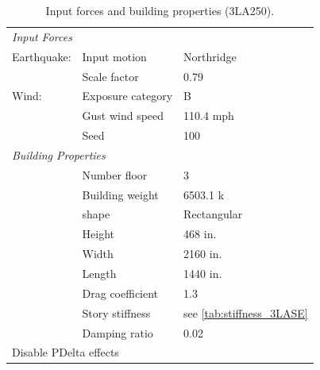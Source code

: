 \documentclass{simcenterdocumentation}
\begin{document}
\begin{table}[H]
	\centering \caption{Input forces and building properties (3LA250).}
	\begin{tabular}{lll}
	\toprule
	\multicolumn{3}{l}{\textit{Input Forces}}					\\
	\cmidrule(rl){1-3}
	Earthquake:		& Input motion		& Northridge			\\
					& Scale factor		& 0.79					\\
	Wind:			& Exposure category	& B						\\
					& Gust wind speed	& 110.4 mph				\\
					& Seed				& 100					\\
	\midrule
	\multicolumn{3}{l}{\textit{Building Properties}}			\\
	\cmidrule(rl){1-3}
					& Number floor		& 3						\\
					& Building weight	& 6503.1 k				\\
					& shape				& Rectangular			\\
					& Height			& 468 in.				\\
					& Width				& 2160 in.				\\
					& Length			& 1440 in.				\\
					& Drag coefficient	& 1.3					\\
					& Story stiffness	& see \cref{tab:stiffness_3LASE}				\\
					& Damping ratio		& 0.02					\\
	\midrule
	\multicolumn{3}{l}{Disable PDelta effects}					\\
	\bottomrule
	\end{tabular}
\end{table}
\end{document}
